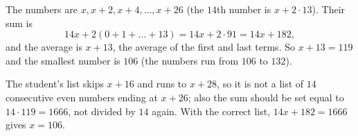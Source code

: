 The numbers are $x,x+2,x+4,\dots,x+26$ (the $14$th number is $x+2\cdot13$). Their sum is
\[
14x+2(0+1+\dots+13)=14x+2\cdot91=14x+182,
\]
and the average is $x+13$, the average of the first and last terms. So $x+13=119$ and the smallest number is $\boxed{106}$ (the numbers run from $106$ to $132$).

The student's list skips $x+16$ and runs to $x+28$, so it is not a list of $14$ consecutive even numbers ending at $x+26$; also the sum should be set equal to $14\cdot119=1666$, not divided by $14$ again. With the correct list, $14x+182=1666$ gives $x=106$.
